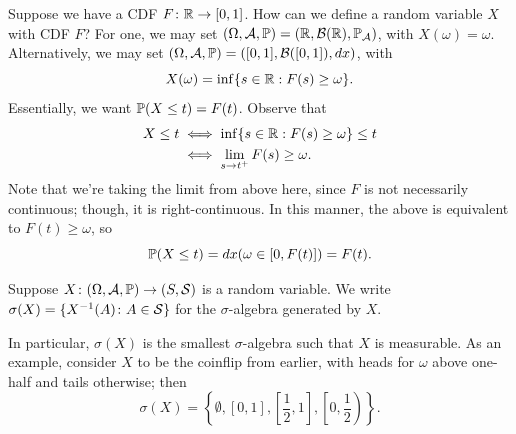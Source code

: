 \begin{example}[Durrett, 1.2.2]
    Suppose we have a CDF $F \colon \mathbb R \to [0, 1]$. How can we define a random variable $X$ with CDF $F$? For one, we may set $(\Omega, \mathcal A, \mathbb P) = (\mathbb R, \mathcal B(\mathbb R), \mathbb P_\mathcal A)$, with $X(\omega) = \omega$. Alternatively, we may set $(\Omega, \mathcal A, \mathbb P) = ([0, 1], \mathcal B([0, 1]), dx)$, with
    \[ X(\omega) = \inf \{s \in \mathbb R : F(s) \geq \omega\}. \]
    Essentially, we want $\mathbb P(X \leq t) = F(t)$. Observe that
    \begin{align*}
        X \leq t &\iff \inf\{s \in \mathbb R : F(s) \geq \omega\} \leq t \\
        &\iff \lim_{s \to t^+} F(s) \geq \omega.
    \end{align*}
    Note that we're taking the limit from above here, since $F$ is not necessarily continuous; though, it is right-continuous. In this manner, the above is equivalent to $F(t) \geq \omega$, so
    \[ \mathbb P(X \leq t) = dx(\omega \in [0, F(t)]) = F(t). \]
\end{example}

\begin{definition} \label{defn:sigma_algebra_generated_by_rv}
    Suppose $X \colon (\Omega, \mathcal A, \mathbb P) \to (S, \mathcal S)$ is a random variable. We write $\sigma(X) = \{X^{-1}(A) \colon A \in \mathcal S\}$ for the $\sigma$-algebra generated by $X$.
\end{definition}
In particular, $\sigma(X)$ is the smallest $\sigma$-algebra such that $X$ is measurable. As an example, consider $X$ to be the coinflip from earlier, with heads for $\omega$ above one-half and tails otherwise; then
\[ \sigma(X) = \left\{\emptyset, [0, 1], \left[\frac{1}{2}, 1\right], \left[0, \frac{1}{2}\right)\right\}. \]

